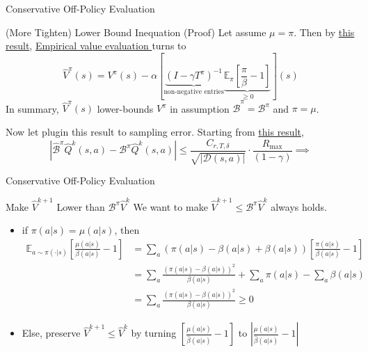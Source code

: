 \documentclass[11pt]{beamer}
\newcommand{\mbb}[1]{\mathbb{#1}}
\newcommand{\mc}[1]{\mathcal{#1}}
\newcommand{\abs}[1]{\left\lvert #1 \right\rvert}
\begin{document}
\begin{frame}{Conservative Off-Policy Evaluation}
  \begin{block}{(More Tighten) Lower Bound Inequation (Proof)}
    Let assume $\mu = \pi$.
    Then by \hyperlink{thm:2_underestimate}{this result}, \hyperlink{thm:v_update_without_sampling_error}{Empirical value evaluation } turns to
    \[
      \hat{V}^{\pi}(s) = V^{\pi}(s) - \alpha\left[ \underbrace{(I - \gamma T^\pi)^{-1}}_{\text{non-negative entries}}  \underbrace{\mbb{E}_{\pi}\left[\frac{\pi}{\beta}-1\right]}_{\geq 0}\right](s)
    \]
    In summary, $\hat{V}^\pi (s)$ lower-bounds $V^{\pi}$ in assumption $\hat{\mc{B}}^\pi = \mc{B}^\pi$ and $\pi = \mu$.

    \bigskip
    Now let plugin this result to sampling error.
    Starting from \hyperlink{appendix:sampling_error}{this result},
    \[
      \abs{\hat{\mc{B}}^\pi \hat{Q}^k (s,a) - \mc{B}^\pi \hat{Q}^k(s,a)} \leq \frac{C_{r,T,\delta}}{\sqrt{\abs{\mc{D}(s,a)}}} \cdot \frac{R_{\text{max}}}{(1-\gamma)} \implies 
    \]
  \end{block}
\end{frame}

\begin{frame}{Conservative Off-Policy Evaluation}
  \hypertarget{thm:2_underestimate}{\begin{block}{Make $\hat{V}^{k+1}$ Lower than $\mc{B}^\pi \hat{V}^{k}$}
    We want to make $\hat{V}^{k+1} \leq \mc{B}^{\pi}\hat{V}^{k}$ always holds.
    \begin{itemize}
      \item if $\pi(a|s) = \mu(a|s)$, then 
      \[
      \begin{aligned}
      \mbb{E}_{a \sim \pi(\cdot|s)}\left[\frac{\mu(a|s)}{\beta(a|s)}-1 \right] &= \sum_a (\pi(a|s) - \beta (a|s)+ \beta(a|s)) \left[\frac{\pi(a|s)}{\beta(a|s)}-1 \right] \\
      & = \sum_a \frac{(\pi(a|s) - \beta(a|s))^2}{\beta(a|s)} + \sum_a \pi(a|s) - \sum_a \beta(a|s) \\
      & = \sum_a \frac{(\pi(a|s) - \beta(a|s))^2}{\beta(a|s)} \geq 0
      \end{aligned}
     \]
     \item Else, preserve $\hat{V}^{k+1} \leq \hat{V}^{k}$ by turning $\left[\frac{\mu(a|s)}{\hat{\beta}(a|s)} -1\right]$ to \hypertarget{thm:2_absolute}{$\abs{\frac{\mu(a|s)}{\hat{\beta}(a|s)}-1}$}
    \end{itemize}
  \end{block}}
\end{frame}
\end{document}
